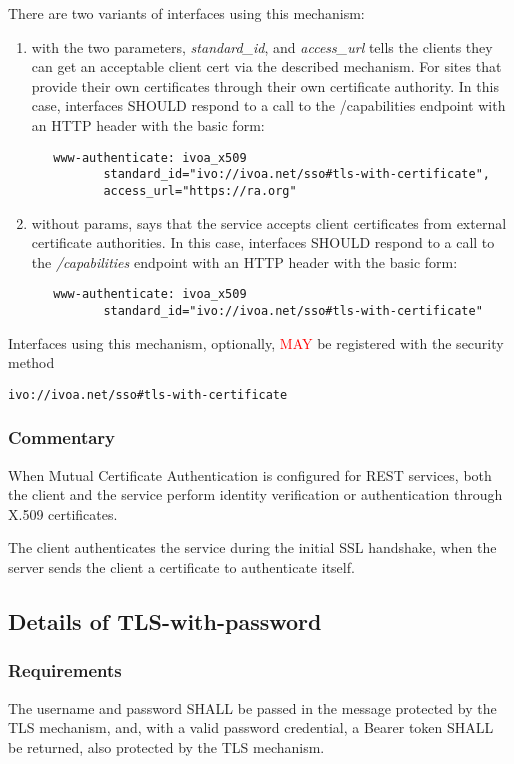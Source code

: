 \documentclass[11pt,a4paper]{ivoa}
\begin{document}
There are two variants of interfaces using this mechanism:
\begin{enumerate}
\item with the two
parameters, \emph{standard\_id}, and \emph{access\_url} tells the
clients they can get an acceptable client
cert via the described mechanism. For sites that provide their own
certificates through their own certificate authority. In this case,
interfaces SHOULD respond to a call to the
/capabilities endpoint with an HTTP header with the basic form:
\begin{verbatim}
   www-authenticate: ivoa_x509
          standard_id="ivo://ivoa.net/sso#tls-with-certificate",
          access_url="https://ra.org"
\end{verbatim}
\item without params, says that the service accepts client certificates
from external certificate authorities. In this case,
interfaces SHOULD respond to a call to the
\emph{/capabilities} endpoint with an HTTP header with the basic form:
\begin{verbatim}
   www-authenticate: ivoa_x509
          standard_id="ivo://ivoa.net/sso#tls-with-certificate"
\end{verbatim}
\end{enumerate}

Interfaces using this mechanism, optionally, \textcolor{red}{MAY} be
registered with the security method

\texttt{ivo://ivoa.net/sso\#tls-with-certificate}

\subsubsection{Commentary}
When Mutual Certificate Authentication is configured for REST services,
both the client and the service perform
identity verification or authentication through X.509 certificates.

The client authenticates the service during the initial SSL handshake,
when the server sends the client a certificate to authenticate itself.

\subsection{Details of TLS-with-password}
\subsubsection{Requirements}
The username and password SHALL be passed in the message protected by
the TLS mechanism, and, with a valid password credential, a Bearer token
SHALL be returned, also protected by the TLS mechanism.
\end{document}
